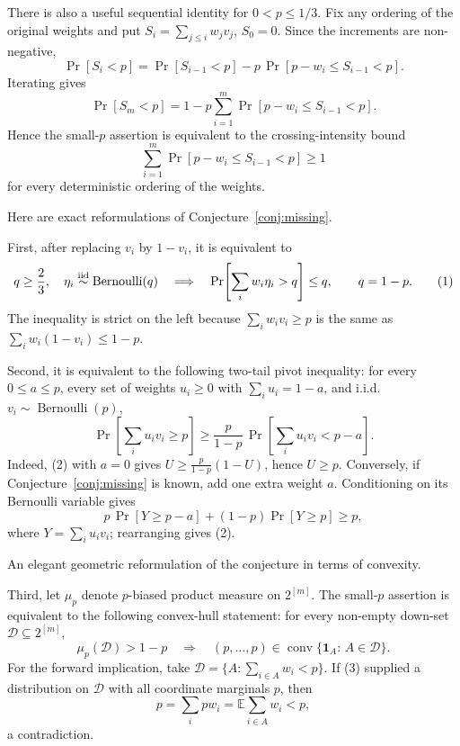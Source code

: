 \documentclass[12pt]{article}
\newcommand{\Ber}{\operatorname{Bernoulli}}
\newcommand{\conv}{\operatorname{conv}}
\newcommand{\review}[1]{\begin{reviewbox}#1\end{reviewbox}}
\begin{document}
There is also a useful sequential identity for \(0<p\le1/3\).  Fix any ordering
of the original weights and put \(S_i=\sum_{j\le i}w_jv_j\), \(S_0=0\).  Since
the increments are non-negative,
\[
 \Pr[S_i<p]=\Pr[S_{i-1}<p]
      -p\,\Pr[p-w_i\le S_{i-1}<p].
\]
Iterating gives
\[
 \Pr[S_m<p]
   =1-p\sum_{i=1}^m\Pr[p-w_i\le S_{i-1}<p].              \tag{10}
\]
Hence the small-\(p\) assertion is equivalent to the crossing-intensity bound
\[
        \sum_{i=1}^m\Pr[p-w_i\le S_{i-1}<p]\ge1
\]
for every deterministic ordering of the weights.

Here are exact reformulations of Conjecture~\ref{conj:missing}.

First, after replacing \(v_i\) by \(1-v_i\), it is equivalent to
\[
   q\ge\frac23,\quad \eta_i\stackrel{\rm iid}{\sim}\Ber(q)
   \quad\Longrightarrow\quad
   \Pr\!\left[\sum_i w_i\eta_i>q\right]\le q ,
   \qquad q=1-p .                                      \tag{1}
\]
The inequality is strict on the left because
\(\sum_i w_i v_i\ge p\) is the same as
\(\sum_iw_i(1-v_i)\le1-p\).

Second, it is equivalent to the following two-tail pivot inequality: for every
\(0\le a\le p\), every set of weights \(u_i\ge0\) with
\(\sum_i u_i=1-a\), and i.i.d.\ \(v_i\sim\Ber(p)\),
\[
   \Pr\!\left[\sum_i u_i v_i\ge p\right]
   \ge
   \frac{p}{1-p}\,
   \Pr\!\left[\sum_i u_i v_i<p-a\right].                 \tag{2}
\]
Indeed, (2) with \(a=0\) gives
\(U\ge\frac{p}{1-p}(1-U)\), hence \(U\ge p\).  Conversely, if
Conjecture~\ref{conj:missing} is known, add one extra weight \(a\).  Conditioning on
its Bernoulli variable gives
\[
 p\,\Pr[Y\ge p-a]+(1-p)\Pr[Y\ge p]\ge p,
\]
where \(Y=\sum_i u_i v_i\); rearranging gives (2).

\review{An elegant geometric reformulation of the conjecture in terms of convexity.}
Third, let \(\mu_p\) denote \(p\)-biased product measure on \(2^{[m]}\).  The
small-\(p\) assertion is equivalent to the following convex-hull statement: for
every non-empty down-set \(\mathcal D\subseteq 2^{[m]}\),
\[
       \mu_p(\mathcal D)>1-p
       \quad\Longrightarrow\quad
       (p,\ldots,p)\in
       \conv\{\mathbf 1_A:\,A\in\mathcal D\}.             \tag{3}
\]
For the forward implication, take
\(\mathcal D=\{A:\sum_{i\in A}w_i<p\}\).  If (3) supplied a distribution on
\(\mathcal D\) with all coordinate marginals \(p\), then
\[
 p=\sum_i p w_i
   =\mathbb E\sum_{i\in A}w_i
   <p,
\]
a contradiction.
\end{document}
